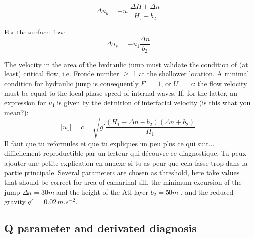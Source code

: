 \begin{equation}
\Delta u_b = -u_1 \frac{\Delta H + \Delta n}{H_2-b_2}
\end{equation}

For the surface flow:
\begin{equation}
\Delta u_s = - u_1\frac{\Delta n}{b_2}
\end{equation}

The velocity in the area of the hydraulic jump must validate the condition of (at least) critical flow, i.e. Froude number $\geq$ 1 at the shallower location. A minimal condition for hydraulic jump is consequently $F\ =\ 1$, or $U\ =\ c$: the flow velocity must be equal to the local phase speed of internal waves. If, for the latter, \color{blue} an expression for $u_1$ is given by the definition of interfacial velocity  \color{green}(is this what you mean?): \color{blue} 
\begin{equation}
|u_1|=c=\sqrt{g' \frac{(H_1-\Delta n - b_2)(\Delta n + b_2)}{H_1}}
\end{equation}
 \color{green}Il faut que tu reformules et que tu expliques un peu plus ce qui suit... difficilement reproductible par un lecteur qui découvre ce diagnostique. Tu peux ajouter une petite explication en annexe si tu as peur que cela fasse trop dans la partie principale. \color{black} 
Several parameters are chosen as threshold, here take values that should be correct for area of camarinal sill, the minimum excursion of the jump $\Delta n = 30m$ and the height of the Atl layer $b_2=50 m$ , and the reduced gravity $g'\ =0.02\ m.s^{-2}$.

\subsection{Q parameter and derivated diagnosis}


